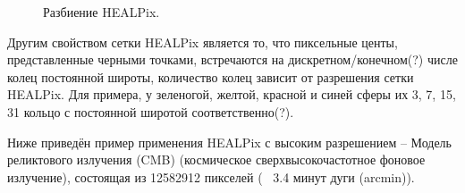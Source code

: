 \documentclass[14pt]{article} %
\begin{document}
\begin{figure}[h!]
\caption{Разбиение HEALPix.}
\label{img:healpixnasa}
\end{figure}

Другим свойством сетки HEALPix является то, что пиксельные центы, представленные черными точками, встречаются на дискретном/конечном(?) числе колец постоянной широты, количество колец зависит от разрешения сетки HEALPix. Для примера, у зеленогой, желтой, красной и синей сферы их 3, 7, 15, 31 кольцо с постоянной широтой соответственно(?).

Ниже приведён пример применения HEALPix с высоким разрешением -- Модель реликтового излучения (CMB) (космическое сверхвысокочастотное фоновое излучение), состоящая из 12582912 пикселей (~ 3.4 минут дуги (arcmin)).
\end{document}
